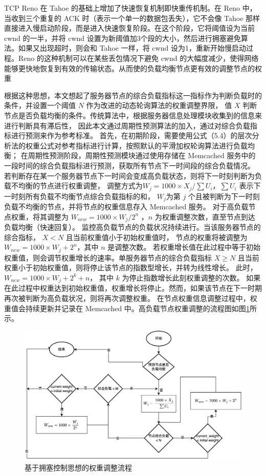 TCP Reno 在 Tahoe 的基础上增加了快速恢复机制即快重传机制。在 Reno 中，当收到三个重复的 ACK 时（表示一个单一的数据包丢失），它不会像 Tahoe 那样直接进入慢启动阶段，而是进入快速恢复阶段。在这个阶段，它将阈值设为当前 cwnd 的一半，并将 cwnd 设置为新阈值加3个段的大小，然后进行拥塞避免算法。如果又出现超时，则会和 Tahoe 一样，将 cwnd 设为1，重新开始慢启动过程。Reno 的这种机制可以在某些丢包情况下避免 cwnd 的大幅度减少，使得网络能够更快地恢复到有效的传输状态。从而使的负载均衡节点更有效的调整节点的权重

根据这种思想，本文想起了服务器节点的综合负载指标这一指标作为判断负载时的条件，并设置一个阈值 $N$ 作为改进的动态轮询算法的权重调整界限，
值 $X$ 判断节点是否负载均衡的条件。传统算法中，根据服务器信息处理模块收集到的信息来进行判断具有滞后性，
因此本文通过周期性预测算法的加入，通过对综合负载指标进行预测来作为参考标准。
首先，在初期阶段，需要使用公式（5.4）的层次分析法的权重公式对参考指标进行计算，按照默认的平滑加权轮询算法进行负载均衡；
在周期性预测阶段，周期性预测模块通过使用存储在 Memcached 服务中的一段时间的综合负载指标进行预测，获取所有节点下一时间段的综合负载情况。
若判断存在某一个服务器节点下一时间会变成高负载状态，则将下一时刻判断为负载不均衡的节点进行权重调整，
调整方式为$W_j = 1000 \times X_{j} / \sum U_{i}$，$\sum U_{i}$ 表示下一时刻所有负载不均衡节点综合负载指标的和，
$W_j$为第 $j$ 个且被判断为下一时刻负载不均衡的节点，并将节点的权重信息存入 Memcached 服务。
对于高负载节点权重，将其调整为 $W_{new} = 1000 \times W_{j} / 2^{n}$ ，$n$ 为权重调整次数，直至节点到达负载均衡（快速回复）。
监控高负载节点的负载状况持续进行。当该服务器节点的综合指标， $X < N$ 且当前权重值小于初始权重值时，
节点的权重将被调整为 $W_{new} = 1000 \times W_{j} + 2^n$，其中 $n$ 是调整次数。
若权重增长值在此过程中等于初始权重值，则会调节权重增长的速率。单服务器节点的综合负载指标 $X \ge N$ 且当前权重小于初始权重值，则将停止该节点的指数型增长，并转为线性增长。
此时， $W_{new} = 1000 \times W_{j} + 2^k + n$， 其中 $k$ 为停止指数增长此刻权重调整的次数。
如果在此过程中权重达到初始权重值，权重增长将停止。然而，如果该节点在下一时期再次被判断为高负载状况，则将再次调整权重。
在节点权重信息调整过程中，权重值会持续更新并记录在 Memcached 中。高负载节点权重调整的流程图如图\ref{contral_weight}所示。

\begin{figure}[htbp]
	\centering
	\includegraphics[width=\textwidth]{figures/change_weight.png}
	\caption{基于拥塞控制思想的权重调整流程}
	\label{contral_weight}
\end{figure}

